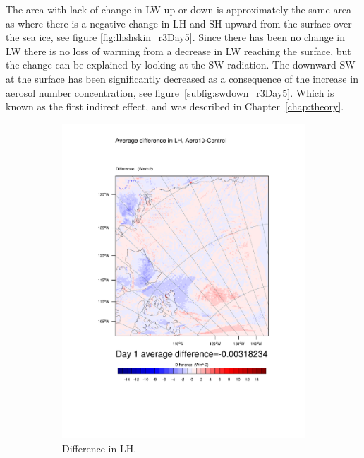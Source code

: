 The area with lack of change in LW up or down is approximately the same area as where there is a negative change in LH and SH upward from the surface over the sea ice, see figure \ref{fig:lhshskin_r3Day5}. Since there has been no change in LW there is no loss of warming from a decrease in LW reaching the surface, but the change can be explained by looking at the SW radiation. The downward SW at the surface has been significantly decreased as a consequence of the increase in aerosol number concentration, see figure~\ref{subfig:swdown_r3Day5}. Which is known as the first indirect effect, and was described in Chapter~\ref{chap:theory}. 
\begin{figure}
\centering
	\begin{subfigure}{0.48\textwidth}
		\includegraphics[width=\textwidth]{results/aero10/diff_Aero10_LH_Day1.pdf}
		\caption{Difference in LH.}
		\label{subfig:lh_r3Day5}
	\end{subfigure}
	\quad
		\begin{subfigure}{0.48\textwidth}

\end{subfigure}
\end{figure}
